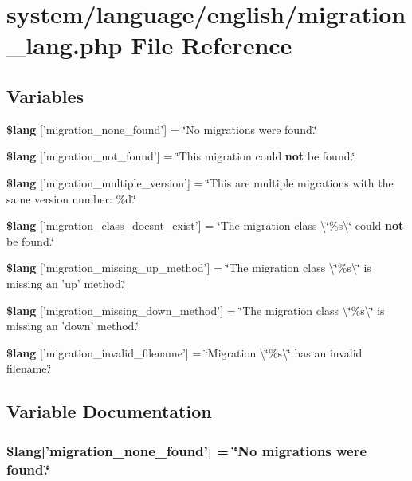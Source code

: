 \section{system/language/english/migration\-\_\-lang.php File Reference}
\label{migration__lang_8php}
\subsection*{Variables}
\begin{DoxyCompactItemize}
\item 
{\bf \$lang} ['migration\-\_\-none\-\_\-found'] = \char`\"{}No migrations were found.\char`\"{}
\item 
{\bf \$lang} ['migration\-\_\-not\-\_\-found'] = \char`\"{}This migration could {\bf not} be found.\char`\"{}
\item 
{\bf \$lang} ['migration\-\_\-multiple\-\_\-version'] = \char`\"{}This are multiple migrations with the same version number\-: \%d.\char`\"{}
\item 
{\bf \$lang} ['migration\-\_\-class\-\_\-doesnt\-\_\-exist'] = \char`\"{}The migration class \textbackslash{}\char`\"{}\%s\textbackslash{}\char`\"{} could {\bf not} be found.\char`\"{}
\item 
{\bf \$lang} ['migration\-\_\-missing\-\_\-up\-\_\-method'] = \char`\"{}The migration class \textbackslash{}\char`\"{}\%s\textbackslash{}\char`\"{} is missing an 'up' method.\char`\"{}
\item 
{\bf \$lang} ['migration\-\_\-missing\-\_\-down\-\_\-method'] = \char`\"{}The migration class \textbackslash{}\char`\"{}\%s\textbackslash{}\char`\"{} is missing an 'down' method.\char`\"{}
\item 
{\bf \$lang} ['migration\-\_\-invalid\-\_\-filename'] = \char`\"{}Migration \textbackslash{}\char`\"{}\%s\textbackslash{}\char`\"{} has an invalid filename.\char`\"{}
\end{DoxyCompactItemize}


\subsection{Variable Documentation}
\subsubsection[{\$lang}]{\setlength{\rightskip}{0pt plus 5cm}\$lang['migration\-\_\-none\-\_\-found'] = \char`\"{}No migrations were found.\char`\"{}}\label{migration__lang_8php_affa6337f0973de810b3c61491deae6b1}



